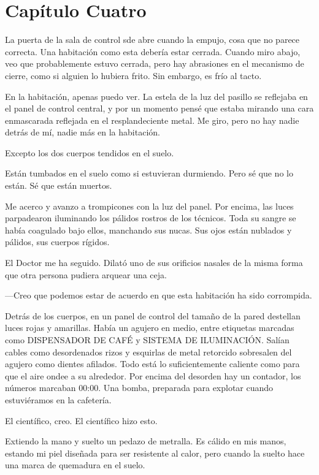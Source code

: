 \chapter*{Capítulo Cuatro}


La puerta de la sala de control sde abre cuando la empujo, cosa que no
parece correcta. Una habitación como esta debería estar cerrada. Cuando
miro abajo, veo que probablemente estuvo cerrada, pero hay abrasiones en
el mecanismo de cierre, como si alguien lo hubiera frito. Sin embargo,
es frío al tacto.

En la habitación, apenas puedo ver. La estela de la luz del pasillo se
reflejaba en el panel de control central, y por un momento pensé que
estaba mirando una cara enmascarada reflejada en el resplandeciente
metal. Me giro, pero no hay nadie detrás de mí, nadie más en la
habitación.

Excepto los dos cuerpos tendidos en el suelo.

Están tumbados en el suelo como si estuvieran durmiendo. Pero sé que no
lo están. Sé que están muertos.

Me acerco y avanzo a trompicones con la luz del panel. Por encima, las
luces parpadearon iluminando los pálidos rostros de los técnicos. Toda
su sangre se había coagulado bajo ellos, manchando sus nucas. Sus ojos
están nublados y pálidos, sus cuerpos rígidos.

El Doctor me ha seguido. Dilató uno de sus orificios nasales de la misma
forma que otra persona pudiera arquear una ceja.

---Creo que podemos estar de acuerdo en que esta habitación ha sido
corrompida.

Detrás de los cuerpos, en un panel de control del tamaño de la pared
destellan luces rojas y amarillas. Había un agujero en medio, entre
etiquetas marcadas como DISPENSADOR DE CAFÉ y SISTEMA DE ILUMINACIÓN.
Salían cables como desordenados rizos y esquirlas de metal retorcido
sobresalen del agujero como dientes afilados. Todo está lo
suficientemente caliente como para que el aire ondee a su alrededor. Por
encima del desorden hay un contador, los números marcaban 00:00. Una
bomba, preparada para explotar cuando estuviéramos en la cafetería.

El científico, creo. El científico hizo esto.

Extiendo la mano y suelto un pedazo de metralla. Es cálido en mis manos,
estando mi piel diseñada para ser resistente al calor, pero cuando la
suelto hace una marca de quemadura en el suelo.

